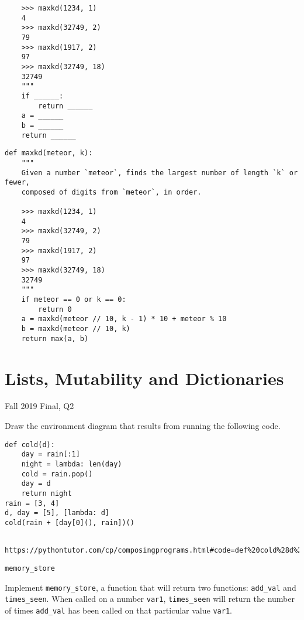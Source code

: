 \documentclass{exam}
\begin{document}
\begin{questions}
\begin{blocksection}
\begin{lstlisting}
	>>> maxkd(1234, 1)
	4
	>>> maxkd(32749, 2)
	79
	>>> maxkd(1917, 2)
	97
	>>> maxkd(32749, 18)
	32749
	"""
	if ______:
		return ______
	a = ______
	b = ______
	return ______
\end{lstlisting}
\end{blocksection}
\begin{solution}
	\begin{lstlisting}
def maxkd(meteor, k):
	"""
	Given a number `meteor`, finds the largest number of length `k` or fewer,
	composed of digits from `meteor`, in order.

	>>> maxkd(1234, 1)
	4
	>>> maxkd(32749, 2)
	79
	>>> maxkd(1917, 2)
	97
	>>> maxkd(32749, 18)
	32749
	"""
	if meteor == 0 or k == 0:
		return 0
	a = maxkd(meteor // 10, k - 1) * 10 + meteor % 10
	b = maxkd(meteor // 10, k)
	return max(a, b)
\end{lstlisting}
\end{solution}
\section{Lists, Mutability and Dictionaries}
\question Fall 2019 Final, Q2
\begin{blocksection}
Draw the environment diagram that results from running the following code.
\begin{lstlisting}
def cold(d):
	day = rain[:1]
	night = lambda: len(day)
	cold = rain.pop()
	day = d
	return night
rain = [3, 4]
d, day = [5], [lambda: d]
cold(rain + [day[0](), rain])()
\end{lstlisting}
\end{blocksection}
\begin{solution}
	\begin{lstlisting}
		https://pythontutor.com/cp/composingprograms.html#code=def%20cold%28d%29%3A%0A%20%20%20%20day%20%3D%20rain%5B%3A1%5D%0A%20%20%20%20night%20%3D%20lambda%3A%20len%28day%29%0A%20%20%20%20cold%20%3D%20rain.pop%28%29%0A%20%20%20%20day%20%3D%20d%0A%20%20%20%20return%20night%0Arain%20%3D%20%5B3,%204%5D%0Ad,%20day%20%3D%20%5B5%5D,%20%5Blambda%3A%20d%5D%0Acold%28rain%20%2B%20%5Bday%5B0%5D%28%29,%20rain%5D%29%28%29&cumulative=true&curInstr=17&mode=display&origin=composingprograms.js&py=3&rawInputLstJSON=%5B%5D
	\end{lstlisting}
\end{solution}
\question \lstinline{memory_store}

\begin{blocksection}
	Implement \lstinline{memory_store}, a function that will return two functions: \lstinline{add_val} and \lstinline{times_seen}. When called on a number \lstinline{var1}, \lstinline{times_seen} will return the number of times \lstinline{add_val} has been called on that particular value \lstinline{var1}.


\end{blocksection}
\end{questions}
\end{document}
